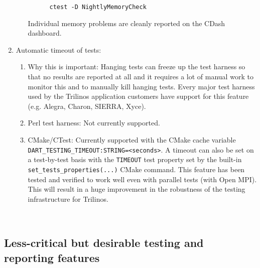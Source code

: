 \documentclass[pdf,ps2pdf,11pt]{SANDreport}
\begin{document}
\begin{enumerate}
\begin{enumerate}
    \begin{verbatim}
      ctest -D NightlyMemoryCheck
    \end{verbatim}

  Individual memory problems are cleanly reported on the CDash
  dashboard.

  \end{enumerate}

{}\item Automatic timeout of tests:

  \begin{enumerate}

  {}\item Why this is important: Hanging tests can freeze up the test
  harness so that no results are reported at all and it requires a lot
  of manual work to monitor this and to manually kill hanging tests.
  Every major test harness used by the Trilinos application customers
  have support for this feature (e.g. Alegra, Charon, SIERRA, Xyce).

  {}\item Perl test harness: Not currently supported.

  {}\item CMake/CTest: Currently supported with the CMake cache
  variable {}\texttt{DART\_TESTING\_TIMEOUT:STRING=<seconds>}.  A
  timeout can also be set on a test-by-test basis with the
  {}\texttt{TIMEOUT} test property set by the built-in
  {}\texttt{set\_tests\_properties(...)} CMake command.  This feature
  has been tested and verified to work well even with parallel tests
  (with Open MPI).  This will result in a huge improvement in the
  robustness of the testing infrastructure for Trilinos.

  \end{enumerate}

\end{enumerate}

\
%
{}\subsection{Less-critical but desirable testing and reporting features}
%
\end{document}
